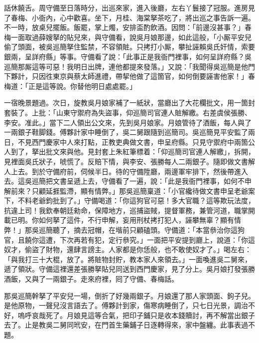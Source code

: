 話休饒舌。周守備至日落時分，出巡來家，進入後廳，左右丫鬟接了冠服。進房見了春梅、小衙內，心中歡喜。坐下，月桂、海棠拏茶吃了，將出巡之事告訴一遍。不一時，放桌兒擺飯。飯罷，掌上燭，安排盃酌飲酒。因問：「前邊沒甚事？」春梅一面取過薛嫂拏的貼兒來，與守備看，說吳月娘那邊，如此這般，「小厮平安兒偷了頭面，被吳巡簡拏住監禁，不容領賍。只拷打小厮，攀扯誣賴吳氏奸情，索要銀兩，呈詳府縣」等事。守備看了說：「此事正是我衙門裡事，如何呈詳府縣？吳巡簡那厮這等可惡！我明日出牌，連他都提來發落。」又說：「我聞得吳巡簡是他門下夥計，只因徃東京與蔡太師進禮，帶挈他做了這箇官，如何倒要誣害他家！」春梅道：「正是這等說。你替他明日處處罷。」

一宿晚景題過。次日，旋教吳月娘家補了一紙狀，當廳出了大花欄批文，用一箇封套裝了。上批：「山東守禦府為失盜事，仰巡簡司官連人賍解繳。右差虞侯張勝、李安。准此。」當下二人領出公文來，先到吳月娘家。月娘管待了酒飯，每人與了一兩銀子鞋脚錢。傅夥計家中睡倒了，吳二舅跟隨到巡簡司。吳巡簡見平安監了兩日，不見西門慶家中人來打點，正教吏典做文書，申呈府縣。只見守禦府中兩箇公人到了，拏出批文來與他。見封套上朱紅筆標着：「仰巡簡司官連人解繳」，拆開，見裡面吳氏狀子，唬慌了。反賠下情，{}與李安、張勝每人二兩銀子。隨即做文書解人上去。到於守備府前，伺候半日。待的守備陞廳，兩邊軍牢排下，然後帶進入去。這吳巡簡把文書呈遞上去，守備看了一遍，說：「此是我衙門裡事，如何不申解前來？只顧延捱監滯，顯有情弊。」那吳巡簡稟道：「小官纔待做文書申呈老爺案下，不料老爺鈞批到了。」守備喝道：「你這狗官可惡！多大官職？這等欺玩法度，抗違上司！我欽奉朝廷勑命，保障地方，巡捕盜賊，提督軍務，兼管河道，職掌開載已明。你如何拏了這件，不行申解，妄用刑杖拷打犯人，誣攀無辜？顯有情弊！」那吳巡簡聽了，摘去冠帽，在堦前只顧磕頭。守備道：「本當叅治你這狗官，且饒你這遭，下次再若有犯，定行叅究。」{}一面把平安提到廳上，說道：「你這奴才，偷盜了財物，還肆言謗主。人家都是你恁般，也不敢使奴才了。」喝左右：「與我打三十大棍，放了。將賍物封貯，教本家人來領去。」一面喚進吳二舅來，遞了領狀。守備這裡還差張勝拏貼兒同送到西門慶家，見了分上。吳月娘打發張勝酒飯，又與了一兩銀子。走來府裡，囘了守備、春梅話。

那吳巡簡幹拏了平安兒一場，倒折了好幾兩銀子。月娘還了那人家頭面、鉤子兒。是他原物，一聲兒沒言語去了。傅夥計到家，傷寒病睡倒了，只七日光景，調治不好，嗚呼哀哉死了。{}月娘見這等合氣，把印子鋪只是收本錢贖討，再不解當出銀子去了。止是教吳二舅同玳安，在門首生藥鋪子日逐轉得來，家中盤纏。此事表過不題。

